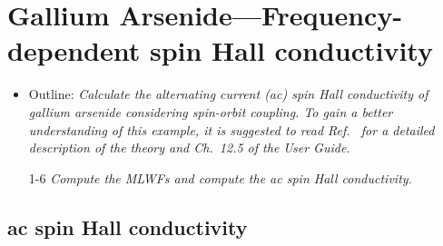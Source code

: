 \section{Gallium Arsenide---Frequency-dependent spin Hall conductivity}
\label{sec30:GaAsSHC}

\begin{itemize}
	\item Outline: {\it Calculate the alternating current (ac) spin Hall conductivity
	of gallium arsenide considering spin-orbit coupling. 
	To gain a better understanding of this example, 
	it is suggested to read Ref.~ for a detailed 
	description of the theory and Ch.~12.5 of the User Guide.}
\end{itemize}

\begin{itemize}
	\item[1-6] {\it Compute the MLWFs and compute the ac spin Hall conductivity.} 
\end{itemize}

\subsection*{ac spin Hall conductivity}

